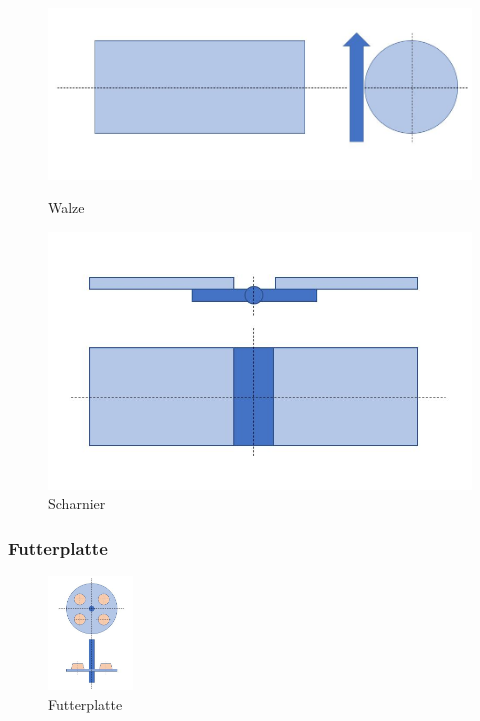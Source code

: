 \begin{figure}[H]
   \begin{minipage}[hbt]{.4\linewidth} %
      \includegraphics[width=\linewidth]{Bilder/Powerpoint/Walze}
      \caption{Walze}
      \label{Walze}
   \end{minipage}
   \hspace{.2\linewidth}%
   \begin{minipage}[hbt]{.4\linewidth} %
      \includegraphics[width=\linewidth]{Bilder/Powerpoint/Schanier}
      \caption{Scharnier}
	  \label{Scharnier}      
      \end{minipage}
\end{figure}

\subsubsection{Futterplatte}

\begin{figure}
\vspace{-30pt}
  \begin{center}
    \includegraphics[width=0.20\textwidth]{Bilder/Powerpoint/Futterplatte}
  \end{center}
  \caption{Futterplatte}
  \label{Futterplatte}
  \vspace{-20pt}
\end{figure}


